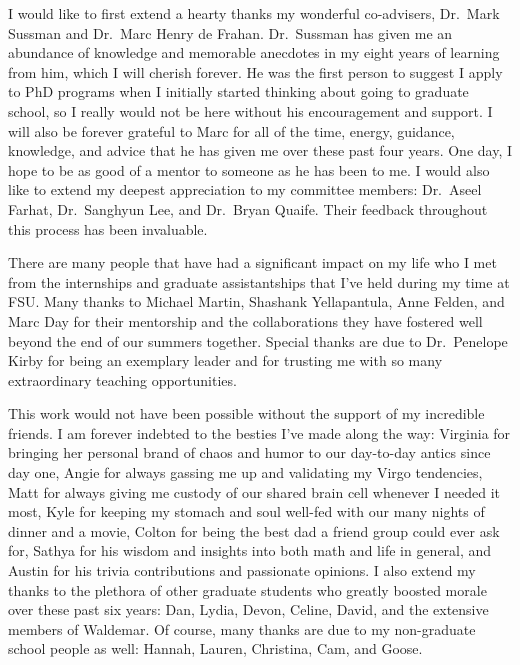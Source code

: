 \documentclass[11pt,expanded,copyright]{fsuthesis}
\begin{document}
\begin{acknowledgments}
I would like to first extend a hearty thanks my wonderful co-advisers, Dr.\ Mark Sussman and Dr.\ Marc Henry de Frahan. Dr.\ Sussman has given me an abundance of knowledge and memorable anecdotes in my eight years of learning from him, which I will cherish forever. He was the first person to suggest I apply to PhD programs when I initially started thinking about going to graduate school, so I really would not be here without his encouragement and support. I will also be forever grateful to Marc for all of the time, energy, guidance, knowledge, and advice that he has given me over these past four years. One day, I hope to be as good of a mentor to someone as he has been to me. I would also like to extend my deepest appreciation to my committee members: Dr.\ Aseel Farhat, Dr.\ Sanghyun Lee, and Dr.\ Bryan Quaife. Their feedback throughout this process has been invaluable. 

There are many people that have had a significant impact on my life who I met from the internships and graduate assistantships that I've held during my time at FSU. Many thanks to Michael Martin, Shashank Yellapantula, Anne Felden, and Marc Day for their mentorship and the collaborations they have fostered well beyond the end of our summers together. Special thanks are due to Dr.\ Penelope Kirby for being an exemplary leader and for trusting me with so many extraordinary teaching opportunities.  

This work would not have been possible without the support of my incredible friends. I am forever indebted to the besties I've made along the way: Virginia for bringing her personal brand of chaos and humor to our day-to-day antics since day one, Angie for always gassing me up and validating my Virgo tendencies, Matt for always giving me custody of our shared brain cell whenever I needed it most, Kyle for keeping my stomach and soul well-fed with our many nights of dinner and a movie, Colton for being the best dad a friend group could ever ask for, Sathya for his wisdom and insights into both math and life in general, and Austin for his trivia contributions and passionate opinions. I also extend my thanks to the plethora of other graduate students who greatly boosted morale over these past six years: Dan, Lydia, Devon, Celine, David, and the extensive members of Waldemar. Of course, many thanks are due to my non-graduate school people as well: Hannah, Lauren, Christina, Cam, and Goose. 


\end{acknowledgments}
\end{document}
